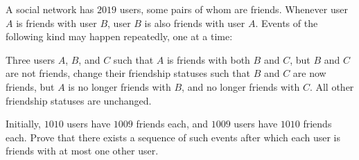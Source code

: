 A social network has $2019$ users, some pairs of whom are friends. Whenever user $A$ is friends with user $B$, user $B$ is also friends with user $A$. Events of the following kind may happen repeatedly, one at a time:

\begin{center}
Three users $A$, $B$, and $C$ such that $A$ is friends with both $B$ and $C$, but $B$ and $C$ are not friends, change their friendship statuses such that $B$ and $C$ are now friends, but $A$ is no longer friends with $B$, and no longer friends with $C$. All other friendship statuses are unchanged.
\end{center}

Initially, $1010$ users have $1009$ friends each, and $1009$ users have $1010$ friends each. Prove that there exists a sequence of such events after which each user is friends with at most one other user.